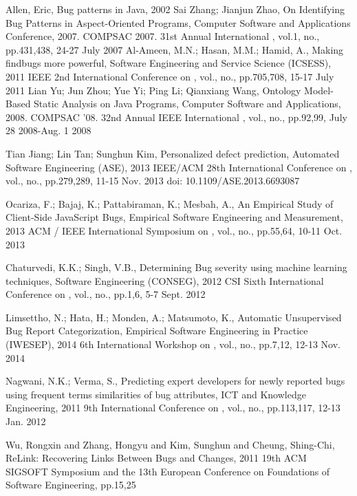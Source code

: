 \documentclass[conference]{IEEEtran}
\begin{document}
\begin{thebibliography}{1}
   Allen, Eric, Bug patterns in Java, 2002
   Sai Zhang; Jianjun Zhao, On Identifying Bug Patterns in Aspect-Oriented Programs, Computer Software and Applications Conference, 2007. COMPSAC 2007. 31st Annual International , vol.1, no., pp.431,438, 24-27 July 2007
   Al-Ameen, M.N.; Hasan, M.M.; Hamid, A., Making findbugs more powerful, Software Engineering and Service Science (ICSESS), 2011 IEEE 2nd International Conference on , vol., no., pp.705,708, 15-17 July 2011
   Lian Yu; Jun Zhou; Yue Yi; Ping Li; Qianxiang Wang, Ontology Model-Based Static Analysis on Java Programs, Computer Software and Applications, 2008. COMPSAC '08. 32nd Annual IEEE International , vol., no., pp.92,99, July 28 2008-Aug. 1 2008

   Tian Jiang; Lin Tan; Sunghun Kim, Personalized defect prediction, Automated Software Engineering (ASE), 2013 IEEE/ACM 28th International Conference on , vol., no., pp.279,289, 11-15 Nov. 2013 doi: 10.1109/ASE.2013.6693087

   Ocariza, F.; Bajaj, K.; Pattabiraman, K.; Mesbah, A., An Empirical Study of Client-Side JavaScript Bugs, Empirical Software Engineering and Measurement, 2013 ACM / IEEE International Symposium on , vol., no., pp.55,64, 10-11 Oct. 2013

   Chaturvedi, K.K.; Singh, V.B., Determining Bug severity using machine learning techniques, Software Engineering (CONSEG), 2012 CSI Sixth International Conference on , vol., no., pp.1,6, 5-7 Sept. 2012

   Limsettho, N.; Hata, H.; Monden, A.; Matsumoto, K., Automatic Unsupervised Bug Report Categorization, Empirical Software Engineering in Practice (IWESEP), 2014 6th International Workshop on , vol., no., pp.7,12, 12-13 Nov. 2014

   Nagwani, N.K.; Verma, S., Predicting expert developers for newly reported bugs using frequent terms similarities of bug attributes, ICT and Knowledge Engineering, 2011 9th International Conference on , vol., no., pp.113,117, 12-13 Jan. 2012

   Wu, Rongxin and Zhang, Hongyu and Kim, Sunghun and Cheung, Shing-Chi, ReLink: Recovering Links Between Bugs and Changes, 2011 19th ACM SIGSOFT Symposium and the 13th European Conference on Foundations of Software Engineering, pp.15,25


\end{thebibliography}
\end{document}
